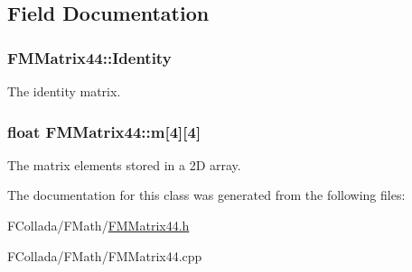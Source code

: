 \subsection{Field Documentation}
\hypertarget{classFMMatrix44_a6ec620d68ab61a95e3b4b5f7e7300468}{
\subsubsection[{Identity}]{ {\bf FMMatrix44::Identity}}}
\label{classFMMatrix44_a6ec620d68ab61a95e3b4b5f7e7300468}
The identity matrix. \hypertarget{classFMMatrix44_a709b1f27940c291ea1482866d3a165d0}{
\subsubsection[{m}]{\setlength{\rightskip}{0pt plus 5cm}float {\bf FMMatrix44::m}\mbox{[}4\mbox{]}\mbox{[}4\mbox{]}}}
\label{classFMMatrix44_a709b1f27940c291ea1482866d3a165d0}
The matrix elements stored in a 2D array. 

The documentation for this class was generated from the following files:\begin{DoxyCompactItemize}
\item 
FCollada/FMath/\hyperlink{FMMatrix44_8h}{FMMatrix44.h}\item 
FCollada/FMath/FMMatrix44.cpp\end{DoxyCompactItemize}
